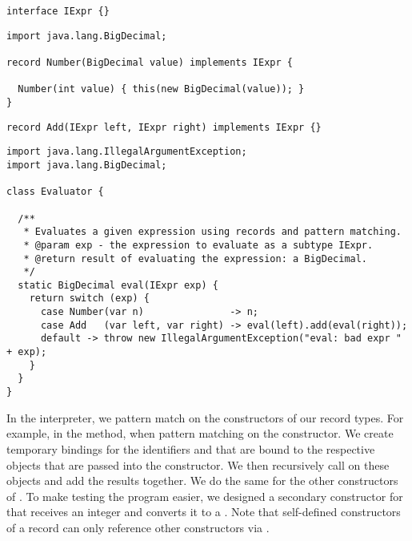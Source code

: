 \begin{lstlisting}[language=MyJava]
interface IExpr {}
\end{lstlisting}

\begin{lstlisting}[language=MyJava]
import java.lang.BigDecimal;

record Number(BigDecimal value) implements IExpr {
  
  Number(int value) { this(new BigDecimal(value)); }
}
\end{lstlisting}

\begin{lstlisting}[language=MyJava]
record Add(IExpr left, IExpr right) implements IExpr {}
\end{lstlisting}

\begin{lstlisting}[language=MyJava]
import java.lang.IllegalArgumentException;
import java.lang.BigDecimal;

class Evaluator {

  /**
   * Evaluates a given expression using records and pattern matching.
   * @param exp - the expression to evaluate as a subtype IExpr.
   * @return result of evaluating the expression: a BigDecimal.
   */
  static BigDecimal eval(IExpr exp) {
    return switch (exp) {
      case Number(var n)               -> n;
      case Add   (var left, var right) -> eval(left).add(eval(right));
      default -> throw new IllegalArgumentException("eval: bad expr " + exp);
    }
  }
}
\end{lstlisting}

In the interpreter, we pattern match on the constructors of our record types. For example, in the  method, when pattern matching on the  constructor. We create temporary bindings for the identifiers  and  that are bound to the respective  objects that are passed into the constructor. We then recursively call  on these objects and add the results together. We do the same for the other constructors of . To make testing the program easier, we designed a secondary constructor for  that receives an integer and converts it to a . Note that self-defined constructors of a record can only reference other constructors via .

